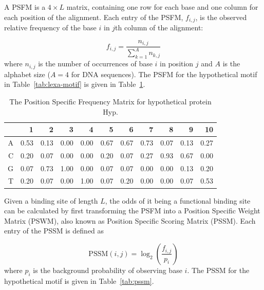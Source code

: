 A PSFM is a $4 \times L$ matrix, containing one row for each base and one
column for each position of the alignment. Each entry of the PSFM, $f_{i, j}$,
is the observed relative frequency of the base $i$ in $j$th column of the
alignment:

\begin{equation}
  \label{eq:psfm}
  f_{i, j} = \frac{n_{i, j}}{\displaystyle\sum_{k=1}^A n_{k, j}}
\end{equation}
where $n_{i, j}$ is the number of occurrences of base $i$ in position $j$ and
$A$ is the alphabet size ($A=4$ for DNA sequences). The PSFM for the
hypothetical motif in Table~\ref{tab:lexa-motif} is given in
Table~\ref{tab:psfm}.

\begin{table}
  \centering
  \caption{The Position Specific Frequency Matrix for hypothetical protein Hyp.}
\label{tab:psfm}
  \begin{tabular}{|r|r|r|r|r|r|r|r|r|r|r|}
\hline
  &    1 &   2 &    3 &    4 &    5 &    6 &    7 &    8 &    9 & 10\\
\hline
A & 0.53 & 0.13 & 0.00 & 0.00 & 0.67 & 0.67 & 0.73 & 0.07 & 0.13 & 0.27 \\
\hline
C & 0.20 & 0.07 & 0.00 & 0.00 & 0.20 & 0.07 & 0.27 & 0.93 & 0.67 & 0.00 \\
\hline
G & 0.07 & 0.73 & 1.00 & 0.00 & 0.07 & 0.07 & 0.00 & 0.00 & 0.13 & 0.20 \\
\hline
T & 0.20 & 0.07 & 0.00 & 1.00 & 0.07 & 0.20 & 0.00 & 0.00 & 0.07 & 0.53 \\
\hline
  \end{tabular}
\end{table}

Given a binding site of length $L$, the odds of it being a functional binding
site can be calculated by first transforming the PSFM into a Position Specific
Weight Matrix (PSWM), also known as Position Specific Scoring Matrix
(PSSM). Each entry of the PSSM is defined as

\begin{equation}
  \label{eq:pssm}
  \mathrm{PSSM}(i, j) = \log_2\left(\frac{f_{i, j}}{p_i}\right)
\end{equation}
where $p_i$ is the background probability of observing base $i$. The PSSM for
the hypothetical motif is given in Table~\ref{tab:pssm}.

